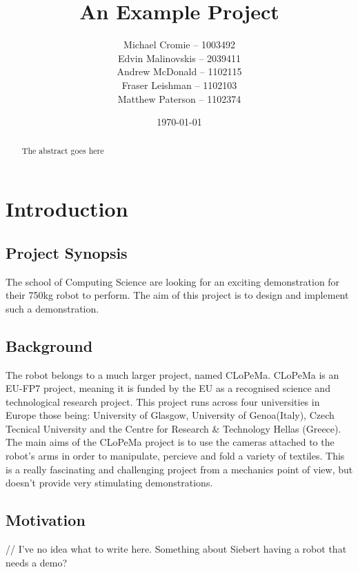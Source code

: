 \documentclass{l3proj}
\begin{document}
\title{An Example Project}
\author{Michael Cromie -- 1003492\\
        Edvin Malinovskis -- 2039411 \\
        Andrew McDonald -- 1102115  \\
        Fraser Leishman -- 1102103 \\
        Matthew Paterson -- 1102374 \\
        }
\date{\today}
\maketitle
\begin{abstract}

The abstract goes here

\end{abstract}
\educationalconsent
\tableofcontents
\chapter{Introduction}
\label{intro}
\section{Project Synopsis}
The school of Computing Science are looking for an exciting demonstration for their 750kg robot to perform. The aim of this project is to design and implement such a demonstration.
\section{Background}
The robot belongs to a much larger project, named CLoPeMa. CLoPeMa is an EU-FP7 project, meaning it is funded by the EU as a recognised science and technological research project. This project runs across four universities in Europe those being: University of Glasgow, University of Genoa(Italy), Czech Tecnical University and the Centre for Research \& Technology Hellas (Greece). 
The main aims of the CLoPeMa project is to use the cameras attached to the robot's arms in order to manipulate, percieve and fold a variety of textiles. This is a really fascinating and challenging project from a mechanics point of view, but doesn't provide very stimulating demonstrations.
\section{Motivation}
// I've no idea what to write here. Something about Siebert having a robot that needs a demo?
\end{document}
